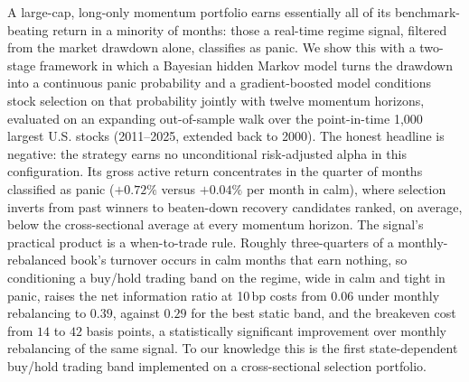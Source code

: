 \documentclass[12pt, a4paper]{article}
\begin{document}
A large-cap, long-only momentum portfolio earns essentially all of its benchmark-beating return in a minority of months: those a real-time regime signal, filtered from the market drawdown alone, classifies as panic. We show this with a two-stage framework in which a Bayesian hidden Markov model turns the drawdown into a continuous panic probability and a gradient-boosted model conditions stock selection on that probability jointly with twelve momentum horizons, evaluated on an expanding out-of-sample walk over the point-in-time 1{,}000 largest U.S. stocks (2011--2025, extended back to 2000). The honest headline is negative: the strategy earns no unconditional risk-adjusted alpha in this configuration. Its gross active return concentrates in the quarter of months classified as panic ($+0.72\%$ versus $+0.04\%$ per month in calm), where selection inverts from past winners to beaten-down recovery candidates ranked, on average, below the cross-sectional average at every momentum horizon. The signal's practical product is a when-to-trade rule. Roughly three-quarters of a monthly-rebalanced book's turnover occurs in calm months that earn nothing, so conditioning a buy/hold trading band on the regime, wide in calm and tight in panic, raises the net information ratio at 10\,bp costs from $0.06$ under monthly rebalancing to $0.39$, against $0.29$ for the best static band, and the breakeven cost from $14$ to $42$ basis points, a statistically significant improvement over monthly rebalancing of the same signal. To our knowledge this is the first state-dependent buy/hold trading band implemented on a cross-sectional selection portfolio.

\newpage
\tableofcontents
\newpage








\newpage



\newpage
\appendix
\renewcommand{\thesection}{\Alph{section}}
\titleformat{\section}{\normalfont\Large\bfseries}{Appendix~\thesection:}{0.5em}{}

\end{document}

